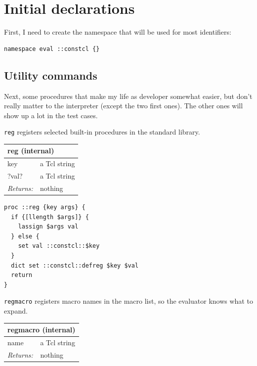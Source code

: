 \documentclass[twoside,9pt]{report}
\begin{document}
\chapter{Initial declarations}
\label{initial-declarations}

First, I need to create the namespace that will be used for most identifiers:

\noindent\makebox[\linewidth]{\rule{\linewidth}{0.4pt}}
\begin{lstlisting}
namespace eval ::constcl {}
\end{lstlisting}
\noindent\makebox[\linewidth]{\rule{\linewidth}{0.4pt}}
\section{Utility commands}
\label{utility-commands}

Next, some procedures that make my life as developer somewhat easier, but don't really matter to the interpreter (except the two first ones). The other ones will show up a lot in the test cases.


\texttt{reg} registers selected built-in procedures in the standard library.

\begin{tabular}{ |l l| }
\hline
\multicolumn{2}{|l|}{reg (internal)} \\
\hline
key & a Tcl string \\
?val? & a Tcl string \\
\textit{Returns:} & nothing \\
\hline
\end{tabular}

\noindent\makebox[\linewidth]{\rule{\linewidth}{0.4pt}}
\begin{lstlisting}
proc ::reg {key args} {
  if {[llength $args]} {
    lassign $args val
  } else {
    set val ::constcl::$key
  }
  dict set ::constcl::defreg $key $val
  return
}
\end{lstlisting}
\noindent\makebox[\linewidth]{\rule{\linewidth}{0.4pt}}

\texttt{regmacro} registers macro names in the macro list, so the evaluator knows what to expand.

\begin{tabular}{ |l l| }
\hline
\multicolumn{2}{|l|}{regmacro (internal)} \\
\hline
name & a Tcl string \\
\textit{Returns:} & nothing \\
\hline
\end{tabular}
\end{document}
